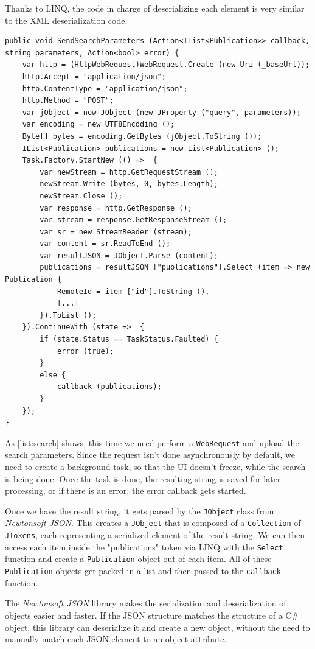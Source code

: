 Thanks to \ac{LINQ}, the code in charge of deserializing each element is very similar to the \ac{XML} deserialization code.

\begin{lstlisting}[frame=lt,caption=Publication Search,label={list:search}]
public void SendSearchParameters (Action<IList<Publication>> callback, string parameters, Action<bool> error) {
	var http = (HttpWebRequest)WebRequest.Create (new Uri (_baseUrl));
	http.Accept = "application/json";
	http.ContentType = "application/json";
	http.Method = "POST";
	var jObject = new JObject (new JProperty ("query", parameters));
	var encoding = new UTF8Encoding ();
	Byte[] bytes = encoding.GetBytes (jObject.ToString ());
	IList<Publication> publications = new List<Publication> ();
	Task.Factory.StartNew (() =>  {
		var newStream = http.GetRequestStream ();
		newStream.Write (bytes, 0, bytes.Length);
		newStream.Close ();
		var response = http.GetResponse ();
		var stream = response.GetResponseStream ();
		var sr = new StreamReader (stream);
		var content = sr.ReadToEnd ();
		var resultJSON = JObject.Parse (content);
		publications = resultJSON ["publications"].Select (item => new Publication {
			RemoteId = item ["id"].ToString (),
			[...]
		}).ToList ();
	}).ContinueWith (state =>  {
		if (state.Status == TaskStatus.Faulted) {
			error (true);
		}
		else {
			callback (publications);
		}
	});
}\end{lstlisting}

As \autoref{list:search} shows, this time we need perform a \texttt{WebRequest} and upload the search parameters. Since the request isn't done asynchronously by default, we need to create a background task, so that the \ac{UI} doesn't freeze, while the search is being done. Once the task is done, the resulting string is saved for later processing, or if there is an error, the error callback gets started.

Once we have the result string, it gets parsed by the \texttt{JObject} class from \textit{Newtonsoft JSON}. This creates a \texttt{JObject} that is composed of a \texttt{Collection} of \texttt{JTokens}, each representing a serialized element of the result string. We can then access each item inside the "publications" token via \ac{LINQ} with the \texttt{Select} function and create a \texttt{Publication} object out of each item. All of these \texttt{Publication} objects get packed in a list and then passed to the \texttt{callback} function.

The \textit{Newtonsoft JSON} library makes the serialization and deserialization of objects easier and faster. If the \ac{JSON} structure matches the structure of a C\# object, this library can deserialize it and create a new object, without the need to manually match each \ac{JSON} element to an object attribute.
 


